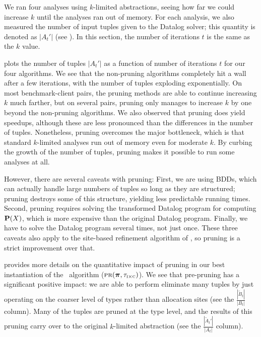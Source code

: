 
We ran four analyses using $k$-limited abstractions, seeing
how far we could increase $k$ until the analyses ran out of memory.
For each analysis, we also measured the number of input tuples given to
the Datalog solver; this quantity is denoted as $|A_t'|$ (see
).  In this section, the number of iterations $t$ is the same as the $k$ value.

 plots the number of tuples $|A_t'|$ as a function of
number of iterations $t$ for our four algorithms.  We see that the
non-pruning algorithms completely hit a wall after a few iterations, with the
number of tuples exploding exponentially.  On most benchmark-client pairs, the
pruning methods are able to continue increasing $k$ much farther, but on several
pairs, pruning only manages to increase $k$ by one beyond the non-pruning algorithms.
We also observed that pruning does yield speedups, although these are
less pronounced than the differences in the number of tuples.  Nonetheless, pruning
overcomes the major bottleneck, which is that standard $k$-limited analyses run
out of memory even for moderate $k$.  By curbing the growth of the
number of tuples, pruning makes it possible to run some analyses at all.

However, there are several caveats with pruning:
First, we are using BDDs, which can actually handle large numbers of tuples
so long as they are structured; pruning destroys some of this structure,
yielding less predictable running times.  Second, pruning requires solving
the transformed Datalog program for computing $\mathbf{P}(X)$, which is more expensive than the original Datalog program.
Finally, we have to solve the Datalog program several times, not just once.
These three caveats also apply to the site-based refinement algorithm of \cite{liang11minimal},
so pruning is a strict improvement over that.


 provides more details on the quantitative impact of pruning in our
best instantiation of the \PR\ algorithm ($\text{\sc pr}(\mbox{\boldmath$\pi$}, \tau_{\text{\sc i} \times \text{\sc c}})$).  We see that pre-pruning has a
significant positive impact: we are able to perform eliminate many tuples by just operating on the coarser
level of types rather than allocation sites (see the $\frac{|\tilde B_t|}{|B_t|}$ column).  Many of the tuples are pruned
at the type level, and the results of this pruning carry over to the original
$k$-limited abstraction (see the $\frac{|\tilde A_t'|}{|A_t|}$ column).

